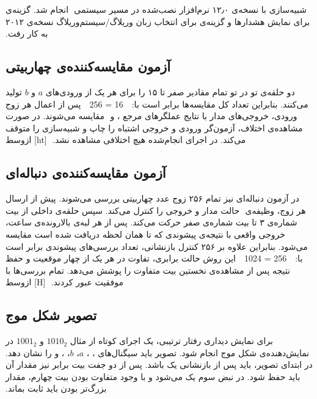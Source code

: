 ‫
‫شبیه‌سازی با نسخه‌ی ۱۲٫۰ نرم‌افزار  نصب‌شده در مسیر سیستمی
‫ انجام شد. گزینه‌ی  برای نمایش هشدارها و گزینه‌ی 
‫برای انتخاب زبان وریلاگ/سیستم‌وریلاگ نسخه‌ی ۲۰۱۲ به کار رفت.
‫
‫
‫\subsection{آزمون مقایسه‌کننده‌ی چهاربیتی}
‫
‫دو حلقه‌ی تو در تو تمام مقادیر صفر تا ۱۵ را برای هر یک از ورودی‌های $a$ و $b$ تولید
‫می‌کنند. بنابراین تعداد کل مقایسه‌ها برابر است با:
‫
‫
‫16  = 256
‫
‫
‫پس از اعمال هر زوج ورودی، خروجی‌های مدار با نتایج عملگرهای مرجع ،  و
‫ مقایسه می‌شوند. در صورت مشاهده‌ی اختلاف، آزمون‌گر ورودی و خروجی اشتباه را چاپ و
‫شبیه‌سازی را متوقف می‌کند. در اجرای انجام‌شده هیچ اختلافی مشاهده نشد.
‫
‫[ht]
‫‌ازوسط
‫
‫
‫
‫
‫
‫
‫\subsection{آزمون مقایسه‌کننده‌ی دنباله‌ای}
‫
‫در آزمون دنباله‌ای نیز تمام ۲۵۶ زوج عدد چهاربیتی بررسی می‌شوند. پیش از ارسال هر زوج، وظیفه‌ی
‫ حالت مدار و خروجی  را کنترل می‌کند. سپس حلقه‌ی داخلی از بیت شماره‌ی
‫۳ تا بیت شماره‌ی صفر حرکت می‌کند. پس از هر لبه‌ی بالارونده‌ی ساعت، خروجی واقعی با نتیجه‌ی
‫پیشوندی که تا همان لحظه دریافت شده است مقایسه می‌شود. بنابراین علاوه بر ۲۵۶ کنترل بازنشانی،
‫تعداد بررسی‌های پیشوندی برابر است با:
‫
‫
‫256  = 1024
‫
‫
‫این روش حالت برابری، تفاوت در هر یک از چهار موقعیت و حفظ نتیجه پس از مشاهده‌ی نخستین بیت
‫متفاوت را پوشش می‌دهد. تمام بررسی‌ها با موفقیت عبور کردند.
‫
‫[H]
‫‌ازوسط
‫
‫
‫
‫
‫
‫
‫\subsection{تصویر شکل موج}
‫
‫برای نمایش دیداری رفتار ترتیبی، یک اجرای کوتاه از مثال $1010_2$ و
‫$1001_2$ در نمایش‌دهنده‌ی شکل موج انجام شود. تصویر باید سیگنال‌های ، ،
‫$a$، $b$، ،  و  را نشان دهد. در ابتدای تصویر،  باید پس از
‫بازنشانی یک باشد. پس از دو جفت بیت برابر نیز مقدار آن باید حفظ شود. در نبض سوم 
‫یک می‌شود و با وجود متفاوت بودن بیت چهارم، مقدار بزرگ‌تر بودن باید ثابت بماند.
